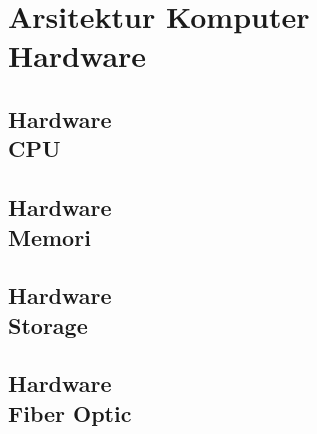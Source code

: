 \documentclass{WileySix}
\begin{document}
\part[Hardware dan Networking]
{Arsitektur Komputer\\ Hardware}

%

\chapter[CPU atau Prosesor]
{Hardware\\ CPU}


%

%

\chapter[Memori]
{Hardware\\ Memori}


\chapter[Storage]
{Hardware\\ Storage}



%


\chapter[Fiber Optic]
{Hardware\\ Fiber Optic}



%






\printindex
\end{document}
